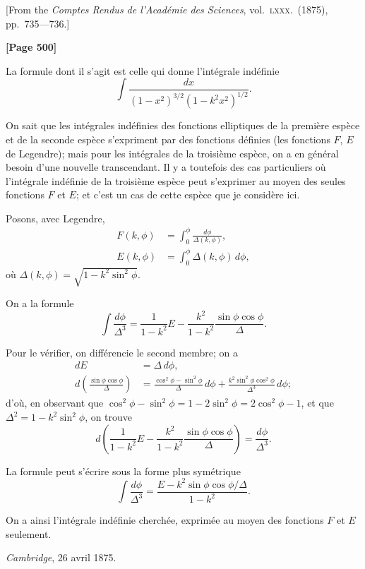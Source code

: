 \documentclass[11pt,a4paper]{article}
\begin{document}
\begin{center}
{\small[From the \textit{Comptes Rendus de l'Acad\' emie des Sciences}, vol.\ \textsc{lxxx}.\ (1875),
pp.\ 735---736.]}
\end{center}

\textbf{[Page 500]}

La formule dont il s'agit est celle qui donne l'int\' egrale ind\' efinie
\[\int\! \frac{dx}{(1-x^{2})^{3/2}(1-k^{2}x^{2})^{1/2}}.\]

On sait que les int\' egrales ind\' efinies des fonctions elliptiques de la premi\` ere esp\` ece
et de la seconde esp\` ece s'expriment par des fonctions d\' efinies (les fonctions $F$, $E$ de
Legendre); mais pour les int\' egrales de la troisi\` eme esp\` ece, on a en g\' en\' eral besoin
d'une nouvelle transcendant. Il y a toutefois des cas particuliers o\` u l'int\' egrale ind\' efinie
de la troisi\` eme esp\` ece peut s'exprimer au moyen des seules fonctions $F$ et $E$; et
c'est un cas de cette esp\` ece que je consid\` ere ici.

Posons, avec Legendre,
\begin{align*}
F(k, \phi) &= \int_{0}^{\phi} \frac{d\phi}{\Delta(k, \phi)}, \\
E(k, \phi) &= \int_{0}^{\phi} \Delta(k, \phi)\, d\phi,
\end{align*}
o\` u $\Delta(k, \phi) = \sqrt{1-k^{2}\sin^{2}\phi}$.

On a la formule
\[\int\! \frac{d\phi}{\Delta^{3}} = \frac{1}{1-k^{2}} E - \frac{k^{2}}{1-k^{2}} \frac{\sin\phi\cos\phi}{\Delta}.\]

Pour le v\' erifier, on diff\' erencie le second membre; on a
\begin{align*}
dE &= \Delta\, d\phi, \\
d\left(\frac{\sin\phi\cos\phi}{\Delta}\right) &= \frac{\cos^{2}\phi - \sin^{2}\phi}{\Delta}\, d\phi
+ \frac{k^{2}\sin^{2}\phi\cos^{2}\phi}{\Delta^{3}}\, d\phi;
\end{align*}
d'o\` u, en observant que $\cos^{2}\phi - \sin^{2}\phi = 1 - 2\sin^{2}\phi = 2\cos^{2}\phi - 1$,
et que $\Delta^{2} = 1 - k^{2}\sin^{2}\phi$, on trouve
\[d\left(\frac{1}{1-k^{2}} E - \frac{k^{2}}{1-k^{2}} \frac{\sin\phi\cos\phi}{\Delta}\right)
= \frac{d\phi}{\Delta^{3}}.\]

La formule peut s'\' ecrire sous la forme plus sym\' etrique
\[\int\! \frac{d\phi}{\Delta^{3}} = \frac{E - k^{2}\sin\phi\cos\phi/\Delta}{1-k^{2}}.\]

On a ainsi l'int\' egrale ind\' efinie cherch\' ee, exprim\' ee au moyen des fonctions
$F$ et $E$ seulement.

\textit{Cambridge}, 26 avril 1875.
\end{document}
